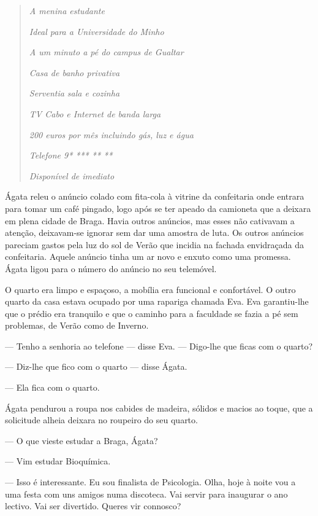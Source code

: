 \begin{quotation}

\emph{A menina estudante}

\emph{Ideal para a Universidade do Minho}

\emph{A um minuto a pé do campus de
Gualtar}

\emph{Casa de banho privativa}

\emph{Serventia sala e cozinha}

\emph{TV Cabo e Internet de banda larga}

\emph{200 euros por mês incluindo gás,
luz e água}

\emph{Telefone 9* *** ** **}

\emph{Disponível de imediato}
\end{quotation}

Ágata releu o anúncio colado com fita-cola à vitrine da confeitaria onde
entrara para tomar um café pingado, logo após se ter apeado da camioneta
que a deixara em plena cidade de Braga. Havia outros anúncios, mas esses
não cativavam a atenção, deixavam-se ignorar sem dar uma amostra de
luta. Os outros anúncios pareciam gastos pela luz do sol de Verão que
incidia na fachada envidraçada da confeitaria. Aquele anúncio tinha um
ar novo e enxuto como uma promessa. Ágata ligou para o número do anúncio no seu telemóvel.

O quarto era limpo e espaçoso, a mobília era funcional e confortável. O
outro quarto da casa estava ocupado por uma rapariga chamada Eva. Eva
garantiu-lhe que o prédio era tranquilo e que o caminho para a
faculdade se fazia a pé sem problemas, de Verão como de Inverno.

--- Tenho a senhoria ao telefone --- disse Eva. --- Digo-lhe que ficas com
  o quarto?

--- Diz-lhe que fico com o quarto --- disse Ágata.

--- Ela fica com o quarto.

Ágata pendurou a roupa nos cabides de madeira, sólidos e macios ao
toque, que a solicitude alheia deixara no roupeiro do seu quarto.

--- O que vieste estudar a Braga, Ágata?

--- Vim estudar Bioquímica.

--- Isso é interessante. Eu sou finalista de Psicologia. Olha, hoje à
  noite vou a uma festa com uns amigos numa discoteca. Vai servir para
  inaugurar o ano lectivo. Vai ser divertido. Queres vir connosco?

